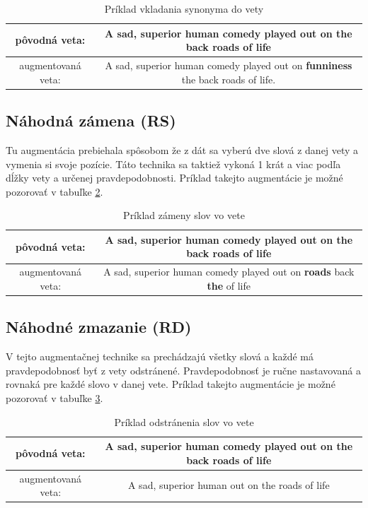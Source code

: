 \documentclass[a4paper, 16pt]{article}
\begin{document}
\begin{table}[H]
\centering
\begin{tabular}{ |c|c| } \hline
pôvodná veta: & A sad, superior human comedy played out on the back roads of life\\ \hline
augmentovaná veta: & A sad, superior human comedy played out on \textbf{funniness} the back roads of life.\\ \hline
\end{tabular}
\caption{Príklad vkladania synonyma do vety}
\label{table:RI}
\end{table}

\subsection{Náhodná zámena (RS)}
\label{RS}
Tu augmentácia prebiehala spôsobom že z dát sa vyberú dve slová z danej vety a vymenia si svoje pozície. Táto technika sa taktiež vykoná 1 krát a viac podľa dĺžky vety a určenej pravdepodobnosti. Príklad takejto augmentácie je možné pozorovať v tabuľke \ref{table:RS}.

\begin{table}[H]
\centering
\begin{tabular}{ |c|c| } \hline
pôvodná veta: & A sad, superior human comedy played out on the back roads of life\\ \hline
augmentovaná veta: & A sad, superior human comedy played out on \textbf{roads} back \textbf{the} of life\\ \hline
\end{tabular}
\caption{Príklad zámeny slov vo vete}
\label{table:RS}
\end{table}

\subsection{Náhodné zmazanie (RD)}
\label{RD}
V tejto augmentačnej technike sa prechádzajú všetky slová a každé má pravdepodobnosť byť z vety odstránené. Pravdepodobnosť je ručne nastavovaná a rovnaká pre každé slovo v danej vete. Príklad takejto augmentácie je možné pozorovať v tabuľke \ref{table:RD}.

\begin{table}[H]
\centering
\begin{tabular}{ |c|c| } \hline
pôvodná veta: & A sad, superior human comedy played out on the back roads of life\\ \hline
augmentovaná veta: & A sad, superior human out on the roads of life\\ \hline
\end{tabular}
\caption{Príklad odstránenia slov vo vete}
\label{table:RD}
\end{table}
\end{document}
